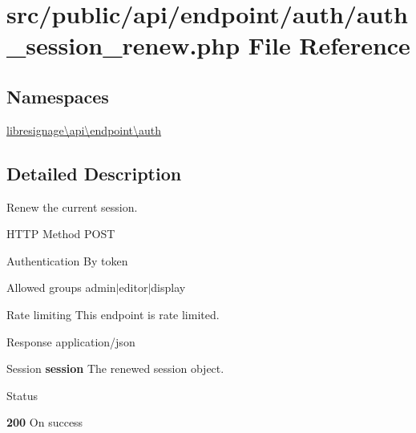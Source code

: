 \hypertarget{src_2public_2api_2endpoint_2auth_2auth__session__renew_8php}{}\section{src/public/api/endpoint/auth/auth\+\_\+session\+\_\+renew.php File Reference}
\label{src_2public_2api_2endpoint_2auth_2auth__session__renew_8php}
\subsection*{Namespaces}
\begin{DoxyCompactItemize}
\item 
 \hyperlink{namespacelibresignage_1_1api_1_1endpoint_1_1auth}{libresignage\textbackslash{}api\textbackslash{}endpoint\textbackslash{}auth}
\end{DoxyCompactItemize}


\subsection{Detailed Description}
Renew the current session.

\begin{DoxyParagraph}{H\+T\+TP Method}
P\+O\+ST 
\end{DoxyParagraph}
\begin{DoxyParagraph}{Authentication}
By token 
\end{DoxyParagraph}
\begin{DoxyParagraph}{Allowed groups}
{\ttfamily admin$\vert$editor$\vert$display} 
\end{DoxyParagraph}
\begin{DoxyParagraph}{Rate limiting}
This endpoint is rate limited.
\end{DoxyParagraph}
\begin{DoxyParagraph}{Response}
application/json
\begin{DoxyItemize}
\item {\ttfamily Session} {\bfseries session} The renewed session object.
\end{DoxyItemize}
\end{DoxyParagraph}
\begin{DoxyParagraph}{Status}

\begin{DoxyItemize}
\item {\bfseries 200} On success 
\end{DoxyItemize}
\end{DoxyParagraph}
